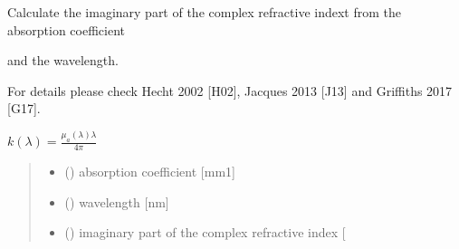 \documentclass[letterpaper,10pt,english]{sphinxmanual}
\begin{document}

\begin{fulllineitems}
\label{\detokenize{03_absorption_coefficient:skinoptics.absorption_coefficient.k_from_mua}}
\pysigstartsignatures
{}
\pysigstopsignatures
\begin{DUlineblock}{0em}
\item[] Calculate the imaginary part of the complex refractive indext from the absorption coefficient
\item[] and the wavelength.
\item[] For details please check Hecht 2002 {[}H02{]}, Jacques 2013 {[}J13{]} and Griffiths 2017 {[}G17{]}.
\end{DUlineblock}

\sphinxAtStartPar
\(k(\lambda) = \frac{\mu_a(\lambda)\lambda}{4\pi}\)
\begin{quote}\begin{description}
\begin{itemize}
\item {} 
\sphinxAtStartPar
{} () \textendash{} absorption coefficient {[}mm\sphinxhyphen{}1{]}

\item {} 
\sphinxAtStartPar
{} () \textendash{} wavelength {[}nm{]}

\end{itemize}

\sphinxAtStartPar
\begin{itemize}
\item {} 
\sphinxAtStartPar
{} () \textendash{} imaginary part of the complex refractive index {[}\sphinxhyphen{}{]}

\end{itemize}


\end{description}\end{quote}

\end{fulllineitems}
\end{document}
